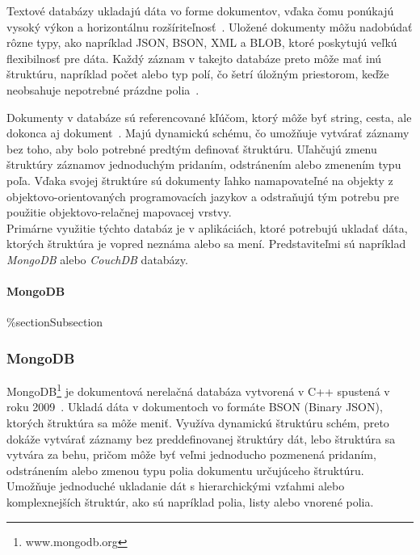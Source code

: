 Textové databázy ukladajú dáta vo forme dokumentov, vďaka čomu ponúkajú vysoký výkon a horizontálnu rozšíriteľnosť~\cite{NoSQLDBvsRealtionDB}. Uložené dokumenty môžu nadobúdať rôzne typy, ako napríklad JSON, BSON, XML a BLOB, ktoré poskytujú veľkú flexibilnosť pre dáta. Každý záznam v takejto databáze preto môže mať inú štruktúru, napríklad počet alebo typ polí, čo šetrí úložným priestorom, keďže neobsahuje nepotrebné prázdne polia~\cite{NoSQLDBvsRealtionDB}.

Dokumenty v databáze sú referencované kľúčom, ktorý môže byť string, cesta, ale dokonca aj dokument~\cite{NoSQLDBvsRealtionDB}. Majú dynamickú schému, čo umožňuje vytvárať záznamy bez toho, aby bolo potrebné predtým definovať štruktúru. Uľahčujú zmenu štruktúry záznamov jednoduchým pridaním, odstránením alebo zmenením typu poľa. Vďaka svojej štruktúre sú dokumenty ľahko namapovateľné na objekty z objektovo-orientovaných programovacích jazykov a odstraňujú tým potrebu pre použitie objektovo-relačnej mapovacej vrstvy.
\\

Primárne využitie týchto databáz je v aplikáciách, ktoré potrebujú ukladať dáta, ktorých štruktúra je vopred neznáma alebo sa mení. Predstaviteľmi sú napríklad \textit{MongoDB} alebo \textit{CouchDB} databázy.

%
%
{
	\paragraph{MongoDB}
}
{
	\%section{Subsection}
	\subsubsection{MongoDB}
}
\label{subsection:mongodb}
MongoDB\footnote{www.mongodb.org} je dokumentová nerelačná databáza vytvorená v C++ spustená v roku 2009~\cite{NoSQLDBvsRealtionDB}. Ukladá dáta v dokumentoch vo formáte BSON (Binary JSON), ktorých štruktúra sa môže meniť. Využíva dynamickú štruktúru schém, preto dokáže vytvárať záznamy bez preddefinovanej štruktúry dát, lebo štruktúra sa vytvára za behu, pričom môže byť veľmi jednoducho pozmenená pridaním, odstránením alebo zmenou typu polia dokumentu určujúceho štruktúru. Umožňuje jednoduché ukladanie dát s hierarchickými vzťahmi alebo komplexnejších štruktúr, ako sú napríklad polia, listy alebo vnorené polia.

